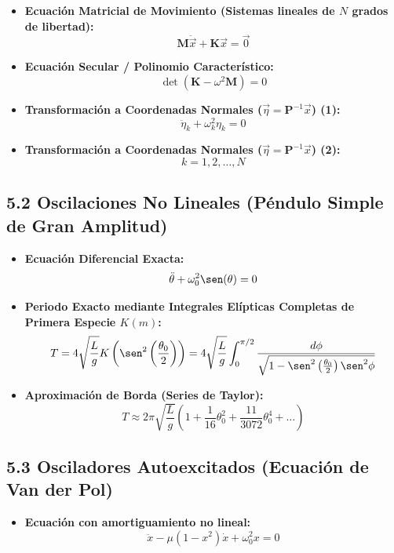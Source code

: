 \documentclass[11pt,a4paper]{article}
\begin{document}
\begin{itemize}
  \item \textbf{Ecuación Matricial de Movimiento (Sistemas lineales de $N$ grados de libertad):}
  \[
    \mathbf{M} \ddot{\vec{x}} + \mathbf{K} \vec{x} = \vec{0}
  \]
  \item \textbf{Ecuación Secular / Polinomio Característico:}
  \[
    \det(\mathbf{K} - \omega^2 \mathbf{M}) = 0
  \]
  \item \textbf{Transformación a Coordenadas Normales ($\vec{\eta} = \mathbf{P}^{-1} \vec{x}$) (1):}
  \[
    \ddot{\eta}_k + \omega_k^2 \eta_k = 0
  \]
  \item \textbf{Transformación a Coordenadas Normales ($\vec{\eta} = \mathbf{P}^{-1} \vec{x}$) (2):}
  \[
    k = 1, 2, \dots, N
  \]
\end{itemize}

\subsection*{5.2 Oscilaciones No Lineales (Péndulo Simple de Gran Amplitud)}

\begin{itemize}
  \item \textbf{Ecuación Diferencial Exacta:}
  \[
    \ddot{\theta} + \omega_0^2 \sen(\theta) = 0
  \]
  \item \textbf{Periodo Exacto mediante Integrales Elípticas Completas de Primera Especie $K(m)$:}
  \[
    T = 4\sqrt{\frac{L}{g}} K\left(\sen^2\left(\frac{\theta_0}{2}\right)\right) = 4\sqrt{\frac{L}{g}} \int_0^{\pi/2} \frac{d\phi}{\sqrt{1 - \sen^2\left(\frac{\theta_0}{2}\right) \sen^2\phi}}
  \]
  \item \textbf{Aproximación de Borda (Series de Taylor):}
  \[
    T \approx 2\pi\sqrt{\frac{L}{g}} \left( 1 + \frac{1}{16}\theta_0^2 + \frac{11}{3072}\theta_0^4 + \dots \right)
  \]
\end{itemize}

\subsection*{5.3 Osciladores Autoexcitados (Ecuación de Van der Pol)}

\begin{itemize}
  \item \textbf{Ecuación con amortiguamiento no lineal:}
  \[
    \ddot{x} - \mu(1 - x^2)\dot{x} + \omega_0^2 x = 0
  \]
\end{itemize}
\end{document}
